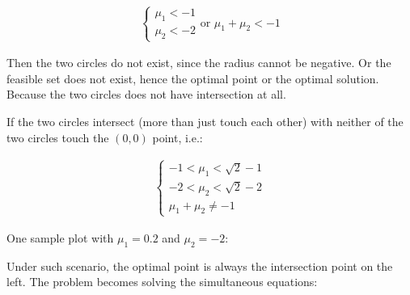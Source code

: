 \documentclass[11pt, letterpaper, titlepage]{article}
\begin{document}
\begin{enumerate}
\begin{enumerate}
        \begin{gather*}
            \begin{cases}
                \mu_1 < -1 \\
                \mu_2 < -2
            \end{cases}
            \text{or }
            \mu_1 + \mu_2 < -1
        \end{gather*}
        
        Then the two circles do not exist, since the radius cannot be negative. Or the feasible set does not exist, hence the optimal point or the optimal solution. Because the two circles does not have intersection at all.
        
        If the two circles intersect (more than just touch each other) with neither of the two circles touch the $(0, 0)$ point, i.e.:
        
        \begin{gather*}
            \begin{cases}
                - 1 < \mu_1 < \sqrt{2} - 1 \\
                - 2 < \mu_2 < \sqrt{2} - 2 \\
                \mu_1 + \mu_2 \neq -1
            \end{cases}
        \end{gather*}
        
        One sample plot with $\mu_1 = 0.2$ and $\mu_2 = -2$:
        
        \begin{center}
        \def\circlee{(1, 1) circle (1.2)}
        \def\circlef{(1, -1) circle (1)}
        \end{center}
        
        Under such scenario, the optimal point is always the intersection point on the left. The problem becomes solving the simultaneous equations:
        

\end{enumerate}
\end{enumerate}
\end{document}
